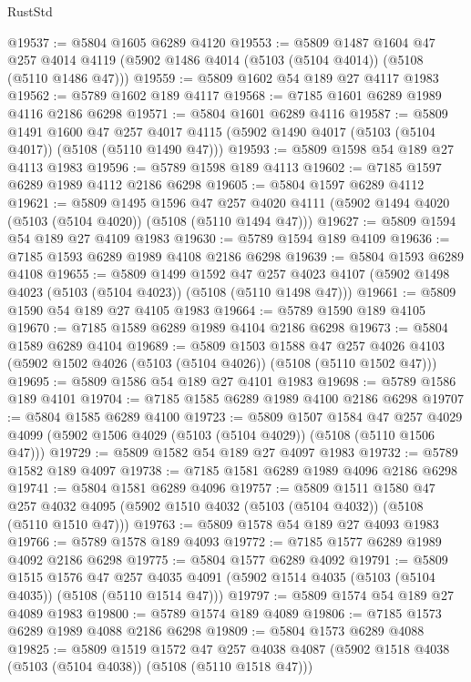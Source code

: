 \begin{lexlean}{RustStd}
\begin{coremodule}
@19537 := @5804 @1605 @6289 @4120
@19553 := @5809
    @1487
    @1604
    @47
    @257
    @4014
    @4119
    (@5902 @1486 @4014 (@5103 (@5104 @4014)) (@5108 (@5110 @1486 @47)))
@19559 := @5809 @1602 @54 @189 @27 @4117 @1983
@19562 := @5789 @1602 @189 @4117
@19568 := @7185 @1601 @6289 @1989 @4116 @2186 @6298
@19571 := @5804 @1601 @6289 @4116
@19587 := @5809
    @1491
    @1600
    @47
    @257
    @4017
    @4115
    (@5902 @1490 @4017 (@5103 (@5104 @4017)) (@5108 (@5110 @1490 @47)))
@19593 := @5809 @1598 @54 @189 @27 @4113 @1983
@19596 := @5789 @1598 @189 @4113
@19602 := @7185 @1597 @6289 @1989 @4112 @2186 @6298
@19605 := @5804 @1597 @6289 @4112
@19621 := @5809
    @1495
    @1596
    @47
    @257
    @4020
    @4111
    (@5902 @1494 @4020 (@5103 (@5104 @4020)) (@5108 (@5110 @1494 @47)))
@19627 := @5809 @1594 @54 @189 @27 @4109 @1983
@19630 := @5789 @1594 @189 @4109
@19636 := @7185 @1593 @6289 @1989 @4108 @2186 @6298
@19639 := @5804 @1593 @6289 @4108
@19655 := @5809
    @1499
    @1592
    @47
    @257
    @4023
    @4107
    (@5902 @1498 @4023 (@5103 (@5104 @4023)) (@5108 (@5110 @1498 @47)))
@19661 := @5809 @1590 @54 @189 @27 @4105 @1983
@19664 := @5789 @1590 @189 @4105
@19670 := @7185 @1589 @6289 @1989 @4104 @2186 @6298
@19673 := @5804 @1589 @6289 @4104
@19689 := @5809
    @1503
    @1588
    @47
    @257
    @4026
    @4103
    (@5902 @1502 @4026 (@5103 (@5104 @4026)) (@5108 (@5110 @1502 @47)))
@19695 := @5809 @1586 @54 @189 @27 @4101 @1983
@19698 := @5789 @1586 @189 @4101
@19704 := @7185 @1585 @6289 @1989 @4100 @2186 @6298
@19707 := @5804 @1585 @6289 @4100
@19723 := @5809
    @1507
    @1584
    @47
    @257
    @4029
    @4099
    (@5902 @1506 @4029 (@5103 (@5104 @4029)) (@5108 (@5110 @1506 @47)))
@19729 := @5809 @1582 @54 @189 @27 @4097 @1983
@19732 := @5789 @1582 @189 @4097
@19738 := @7185 @1581 @6289 @1989 @4096 @2186 @6298
@19741 := @5804 @1581 @6289 @4096
@19757 := @5809
    @1511
    @1580
    @47
    @257
    @4032
    @4095
    (@5902 @1510 @4032 (@5103 (@5104 @4032)) (@5108 (@5110 @1510 @47)))
@19763 := @5809 @1578 @54 @189 @27 @4093 @1983
@19766 := @5789 @1578 @189 @4093
@19772 := @7185 @1577 @6289 @1989 @4092 @2186 @6298
@19775 := @5804 @1577 @6289 @4092
@19791 := @5809
    @1515
    @1576
    @47
    @257
    @4035
    @4091
    (@5902 @1514 @4035 (@5103 (@5104 @4035)) (@5108 (@5110 @1514 @47)))
@19797 := @5809 @1574 @54 @189 @27 @4089 @1983
@19800 := @5789 @1574 @189 @4089
@19806 := @7185 @1573 @6289 @1989 @4088 @2186 @6298
@19809 := @5804 @1573 @6289 @4088
@19825 := @5809
    @1519
    @1572
    @47
    @257
    @4038
    @4087
    (@5902 @1518 @4038 (@5103 (@5104 @4038)) (@5108 (@5110 @1518 @47)))

\end{coremodule}
\end{lexlean}
